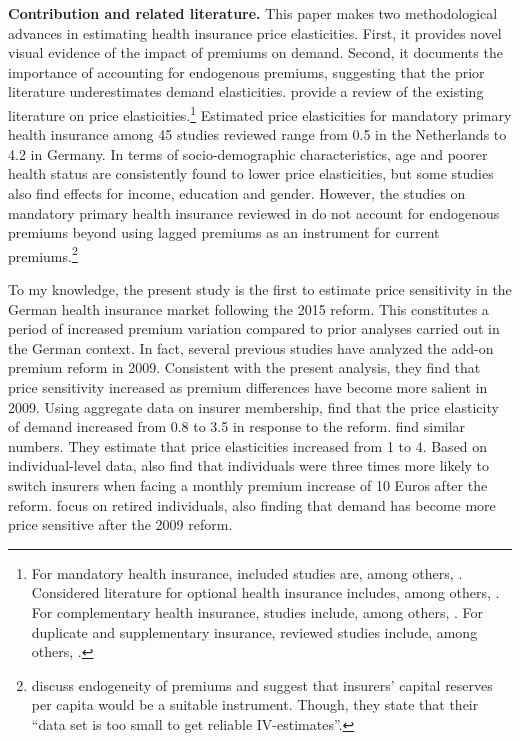 \documentclass[a4paper, 11pt, english]{article}
\begin{document}
\textbf{Contribution and related literature.} 
This paper makes two methodological advances in estimating health insurance price elasticities. First, it provides novel visual evidence of the impact of premiums on demand. Second, it documents the importance of accounting for endogenous premiums, suggesting that the prior literature underestimates demand elasticities. \citet{pendzialek2016differences} provide a review of the existing literature on price elasticities.\footnote{For mandatory health insurance, included studies are, among others, \citet{douven2007measuring, tamm2007elasticities,Schmitz2017}. Considered literature for optional health insurance includes, among others, \citet{cutler1998paying,royalty1999health, parente2004employee}. For complementary health insurance, studies include, among others, \citet{frakt2010beneficiary, starc2014insurer}. For duplicate and supplementary insurance, reviewed studies include, among others, \citet{finkelstein2002effect,costa2003demand}.} Estimated price elasticities for mandatory primary health insurance among 45 studies reviewed range from 0.5 in the Netherlands to 4.2 in Germany. In terms of socio-demographic characteristics, age and poorer health status are consistently found to lower price elasticities, but some studies also find effects for income, education and gender. However, the studies on mandatory primary health insurance reviewed in \citeauthor{pendzialek2016differences} do not account for endogenous premiums beyond using lagged premiums as an instrument for current premiums.\footnote{\citet{schut2002managed} discuss endogeneity of premiums and suggest that insurers' capital reserves per capita would be a suitable instrument. Though, they state that their ``data set is too small to get reliable IV-estimates''.}

To my knowledge, the present study is the first to estimate price sensitivity in the German health insurance market following the 2015 reform. This constitutes a period of increased premium variation compared to prior analyses carried out in the German context.
%
In fact, several previous studies have analyzed the add-on premium reform in 2009. Consistent with the present analysis, they find that price sensitivity increased as premium differences have become more salient in 2009. Using aggregate data on insurer membership, \citet{Pendzialek2015} find that the price elasticity of demand increased from 0.8 to 3.5 in response to the reform. \citet{Schmitz2017} find similar numbers. They estimate that price elasticities increased from 1 to 4. Based on individual-level data, \citeauthor{Schmitz2017} also find that individuals were three times more likely to switch insurers when facing a monthly premium increase of 10 Euros after the reform. \citet{Wuppermann2014} focus on retired individuals, also finding that demand has become more price sensitive after the 2009 reform.
\end{document}
